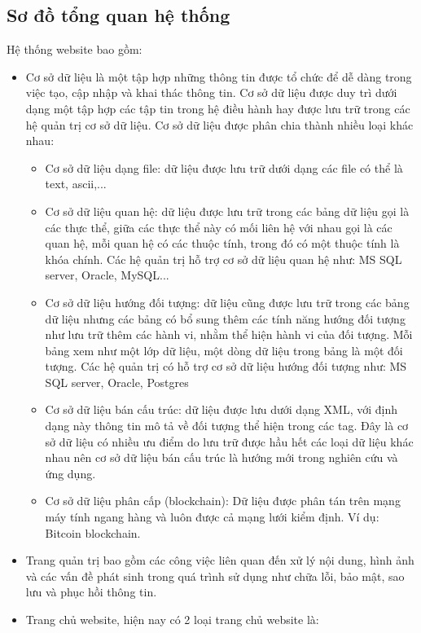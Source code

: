 \subsection{Sơ đồ tổng quan hệ thống}
Hệ thống website bao gồm:
\begin{itemize}
    \item Cơ sở dữ liệu là một tập hợp những thông tin được tổ chức để dễ dàng trong việc tạo, cập nhập và khai thác thông tin. Cơ sở dữ liệu được duy trì dưới dạng một tập hợp các tập tin trong hệ điều hành hay được lưu trữ trong các hệ quản trị cơ sở dữ liệu. Cơ sở dữ liệu được phân chia thành nhiều loại khác nhau:
   \begin{itemize}
   \item Cơ sở dữ liệu dạng file: dữ liệu được lưu trữ dưới dạng các file có thể là text, ascii,...
   \item Cơ sở dữ liệu quan hệ: dữ liệu được lưu trữ trong các bảng dữ liệu gọi là các thực thể, giữa các thực thể này có mối liên hệ với nhau gọi là các quan hệ, mỗi quan hệ có các thuộc tính, trong đó có một thuộc tính là khóa chính. Các hệ quản trị hỗ trợ cơ sở dữ liệu quan hệ như: MS SQL server, Oracle, MySQL...
   \item Cơ sở dữ liệu hướng đối tượng: dữ liệu cũng được lưu trữ trong các bảng dữ liệu nhưng các bảng có bổ sung thêm các tính năng hướng đối tượng như lưu trữ thêm các hành vi, nhằm thể hiện hành vi của đối tượng. Mỗi bảng xem như một lớp dữ liệu, một dòng dữ liệu trong bảng là một đối tượng. Các hệ quản trị có hỗ trợ cơ sở dữ liệu hướng đối tượng như: MS SQL server, Oracle, Postgres
   \item Cơ sở dữ liệu bán cấu trúc: dữ liệu được lưu dưới dạng XML, với định dạng này thông tin mô tả về đối tượng thể hiện trong các tag. Đây là cơ sở dữ liệu có nhiều ưu điểm do lưu trữ được hầu hết các loại dữ liệu khác nhau nên cơ sở dữ liệu bán cấu trúc là hướng mới trong nghiên cứu và ứng dụng.
   \item Cơ sở dữ liệu phân cấp (blockchain): Dữ liệu được phân tán trên mạng máy tính ngang hàng và luôn được cả mạng lưới kiểm định. Ví dụ: Bitcoin blockchain.
   \end{itemize}
    \item Trang quản trị bao gồm các công việc liên quan đến xử lý nội dung, hình ảnh và các vấn đề phát sinh trong quá trình sử dụng như chữa lỗi, bảo mật, sao lưu và phục hồi thông tin.
    \item Trang chủ website, hiện nay có 2 loại trang chủ website là: 
    \begin{itemize}

\end{itemize}
\end{itemize}
